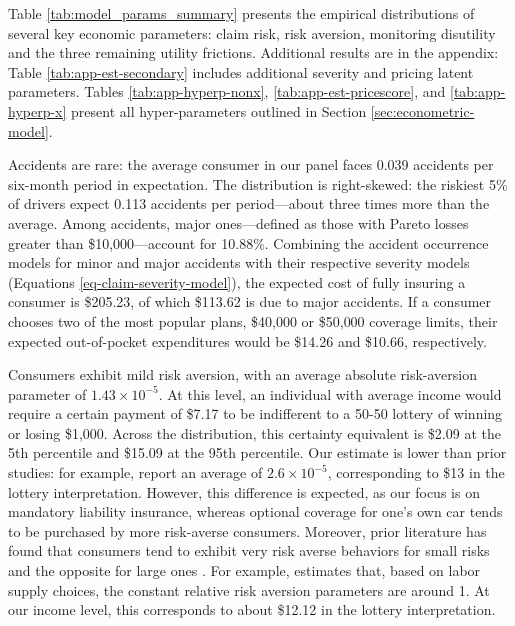 Table \ref{tab:model_params_summary} presents the empirical distributions of several key economic parameters: claim risk, risk aversion, monitoring disutility and the three remaining utility frictions. Additional results are in the appendix: Table \ref{tab:app-est-secondary} includes additional severity and pricing latent parameters. Tables \ref{tab:app-hyperp-nonx}, \ref{tab:app-est-pricescore}, and \ref{tab:app-hyperp-x} present  all hyper-parameters outlined in Section \ref{sec:econometric-model}.

Accidents are rare: the average consumer in our panel faces  0.039  accidents per six-month period in expectation. The distribution is right-skewed:
the riskiest 5\% of drivers expect 0.113 accidents per period---about three times more than the average.  Among accidents, major ones---defined as those with Pareto losses greater than \$10{,}000---account for  10.88\%.  Combining the accident occurrence models for minor and major accidents with their respective severity models (Equations \ref{eq-claim-severity-model}), the expected cost of fully insuring a consumer is  \$205.23,  of which  \$113.62  is due to major accidents. If a consumer chooses two of the most popular plans, \$40{,}000 or \$50{,}000 coverage limits, their expected out-of-pocket expenditures would be  \$14.26  and  \$10.66, respectively.

Consumers exhibit mild risk aversion, with an average absolute risk-aversion parameter of  $1.43 \times 10^{-5}$.  At this level, an individual with average income would require a certain payment of  \$7.17  to be indifferent to a 50-50 lottery of winning or losing \$1{,}000. Across the distribution, this certainty equivalent is  \$2.09  at the 5th percentile and  \$15.09  at the 95th percentile.  Our estimate is lower than prior studies: for example, \textcite{Cohen2007} report an average of $2.6 \times 10^{-5}$, corresponding to  \$13  in the lottery interpretation.
However, this difference is expected, as our focus is on mandatory liability insurance, whereas optional coverage for one's own car tends to be purchased by more risk-averse consumers. Moreover, prior literature  has found that consumers tend to exhibit very risk averse behaviors for small risks and the opposite for large ones \parencite{sydnor2010over}. For example, \textcite{chetty2006new} estimates that, based on labor supply choices, the constant relative risk aversion parameters are around 1. At our income level, this corresponds to about \$12.12 in the lottery interpretation.

